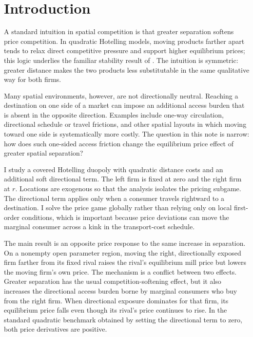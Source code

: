 \section{Introduction}\label{sec:introduction}

A standard intuition in spatial competition is that greater separation softens price competition. In quadratic Hotelling models, moving products farther apart tends to relax direct competitive pressure and support higher equilibrium prices; this logic underlies the familiar stability result of \citet{DAspremontGabszewiczThisse1979}. The intuition is symmetric: greater distance makes the two products less substitutable in the same qualitative way for both firms.

Many spatial environments, however, are not directionally neutral. Reaching a destination on one side of a market can impose an additional access burden that is absent in the opposite direction. Examples include one-way circulation, directional schedule or travel frictions, and other spatial layouts in which moving toward one side is systematically more costly. The question in this note is narrow: how does such one-sided access friction change the equilibrium price effect of greater spatial separation?

I study a covered Hotelling duopoly with quadratic distance costs and an additional soft directional term. The left firm is fixed at zero and the right firm at $r$. Locations are exogenous so that the analysis isolates the pricing subgame. The directional term applies only when a consumer travels rightward to a destination. I solve the price game globally rather than relying only on local first-order conditions, which is important because price deviations can move the marginal consumer across a kink in the transport-cost schedule.

The main result is an opposite price response to the same increase in separation. On a nonempty open parameter region, moving the right, directionally exposed firm farther from its fixed rival raises the rival's equilibrium mill price but lowers the moving firm's own price. The mechanism is a conflict between two effects. Greater separation has the usual competition-softening effect, but it also increases the directional access burden borne by marginal consumers who buy from the right firm. When directional exposure dominates for that firm, its equilibrium price falls even though its rival's price continues to rise. In the standard quadratic benchmark obtained by setting the directional term to zero, both price derivatives are positive.

